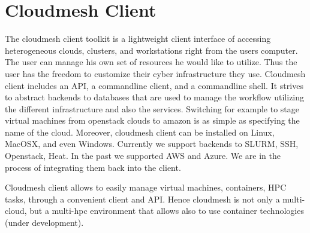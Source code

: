 \section{Cloudmesh Client}


The cloudmesh client toolkit is a lightweight client interface of
accessing heterogeneous clouds, clusters, and workstations right from
the users computer. The user can manage his own set of resources he
would like to utilize. Thus the user has the freedom to customize
their cyber infrastructure they use. Cloudmesh client includes an API,
a commandline client, and a commandline shell. It strives to abstract
backends to databases that are used to manage the workflow utilizing
the different infrastructure and also the services. Switching for
example to stage virtual machines from openstack clouds to amazon is
as simple as specifying the name of the cloud. Moreover, cloudmesh
client can be installed on Linux, MacOSX, and even Windows. Currently
we support backends to SLURM, SSH, Openstack, Heat. In the past we
supported AWS and Azure. We are in the process of integrating them
back into the client.


Cloudmesh client allows to easily manage virtual machines, containers,
HPC tasks, through a convenient client and API. Hence cloudmesh is not
only a multi-cloud, but a multi-hpc environment that allows also to
use container technologies (under development).

